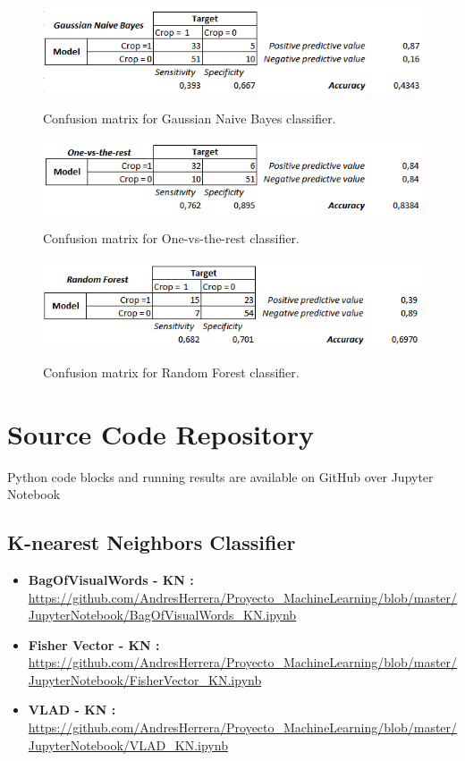 \documentclass[12pt]{article}
\numberwithin{equation}{section}
\numberwithin{table}{section}
\numberwithin{figure}{section}
\begin{document}
\begin{figure}[H] \centering
	\caption{Confusion matrix for Gaussian Naive Bayes classifier. }
	\includegraphics[width=1\textwidth]{m13.png}
	\label{m13}
\end{figure}

\begin{figure}[H] \centering
	\caption{Confusion matrix for One-vs-the-rest classifier. }
	\includegraphics[width=1\textwidth]{m14.png}
	\label{m14}
\end{figure}

\begin{figure}[H] \centering
	\caption{Confusion matrix for Random Forest classifier. }
	\includegraphics[width=1\textwidth]{m15.png}
	\label{m15}
\end{figure}




\section{Source Code Repository}

Python code blocks and running results are available on GitHub over Jupyter Notebook

\subsection{K-nearest Neighbors Classifier }

\begin{itemize}
	\item {\textbf{BagOfVisualWords - KN :} } \url{https://github.com/AndresHerrera/Proyecto_MachineLearning/blob/master/JupyterNotebook/BagOfVisualWords_KN.ipynb}
	
	\item {\textbf{Fisher Vector - KN :} } \url{	https://github.com/AndresHerrera/Proyecto_MachineLearning/blob/master/JupyterNotebook/FisherVector_KN.ipynb}
	
	\item {\textbf{VLAD - KN :} } \url{	https://github.com/AndresHerrera/Proyecto_MachineLearning/blob/master/JupyterNotebook/VLAD_KN.ipynb}
		
\end{itemize}
\end{document}
